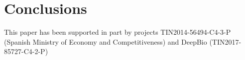 \documentclass[sigconf]{acmart}
\begin{document}
\section{Conclusions}
\label{sec:conclusions}

\begin{acks}

  This paper has been supported in part by
projects TIN2014-56494-C4-3-P (Spanish Ministry of Economy and
Competitiveness) and DeepBio (TIN2017-85727-C4-2-P)


\end{acks}




\end{document}

